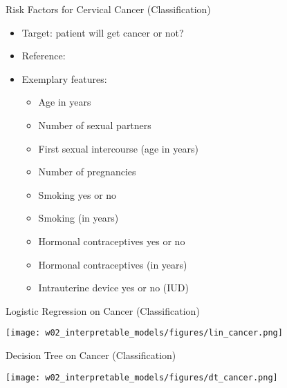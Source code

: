 \documentclass[aspectratio=169]{../latex_main/tntbeamer}  %
\begin{document}
    \begin{frame}{Risk Factors for Cervical Cancer (Classification)}
        
        \begin{itemize}
            \item Target: patient will get cancer or not?
            \item Reference: 
            \item Exemplary features:
            \begin{itemize}
                \item Age in years
                \item Number of sexual partners
                \item First sexual intercourse (age in years)
                \item Number of pregnancies
                \item Smoking yes or no
                \item Smoking (in years)
                \item Hormonal contraceptives yes or no
                \item Hormonal contraceptives (in years)
                \item Intrauterine device yes or no (IUD)
            \end{itemize}
        \end{itemize}
        
    \end{frame}
	
	\begin{frame}{Logistic Regression on  Cancer (Classification)}
        
        \centering
        \texttt{[image: w02\_interpretable\_models/figures/lin\_cancer.png]}
        
    \end{frame}
	
	\begin{frame}{Decision Tree on  Cancer (Classification)}
        
        \centering
        \texttt{[image: w02\_interpretable\_models/figures/dt\_cancer.png]}
    \end{frame}
	
\end{document}
